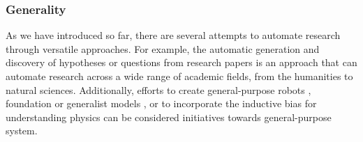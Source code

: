\documentclass{article}
\begin{document}





\subsubsection{Generality}
As we have introduced so far, there are several attempts to automate research through versatile approaches. For example, the automatic generation and discovery of hypotheses \cite{kang2022augmenting,chan2018solvent,wang2023learning,xu2023exploring} or questions \cite{lahat2023evaluating,liu2023creative,oppenlaender2023mapping,surita2020can} from research papers is an approach that can automate research across a wide range of academic fields, from the humanities to natural sciences. Additionally, efforts to create general-purpose robots  \cite{yachie2017robotic}, foundation or generalist models \cite{singhal2023towards,taylor2022galactica}, or to incorporate the inductive bias for understanding physics can be considered initiatives towards general-purpose system.
\end{document}
